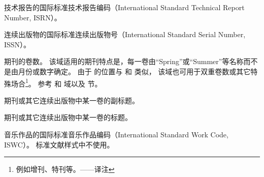 \begin{fieldlist}


技术报告的国际标准技术报告编码（International Standard Technical Report Number,  ISRN）。




连续出版物的国际标准连续出版物号（International Standard Serial Number,  ISSN）。




期刊的卷数。
该域适用的期刊特点是，每一卷由“Spring”或“Summer”等名称而不是由月份或数字确定。
由于  的位置与  和  类似，
该域也可用于双重卷数或其它特殊场合\footnote{
	例如增刊、特刊等。——译注}。
参考  和  域以及  节。




期刊或其它连续出版物中某一卷的副标题。




期刊或其它连续出版物中某一卷的标题。




音乐作品的国际标准音乐作品编码（International Standard Work Code,  ISWC）。
标准文献样式中不使用。


\end{fieldlist}
